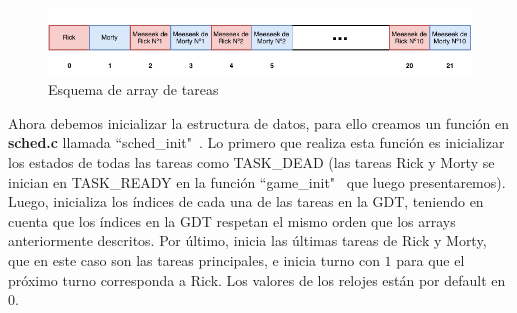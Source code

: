 \documentclass[a4paper]{article}
\begin{document}
\begin{figure}[h]
	\centering
	\includegraphics[scale=1.0]{img/ArrayRickyMortyIDX.pdf}
	\caption{Esquema de array de tareas}
	\label{fig:array_tarea}
\end{figure}

\justify


\justify
Ahora debemos inicializar la estructura de datos, para ello creamos un función en \textbf{sched.c} llamada ``sched_init"\ . Lo primero que realiza esta función es inicializar los estados de todas las tareas como TASK_DEAD (las tareas Rick y Morty se inician en TASK_READY en la función ``game_init" \ que luego presentaremos). Luego, inicializa los índices de cada una de las tareas en la GDT, teniendo en cuenta que los índices en la GDT respetan el mismo orden que los arrays anteriormente descritos. Por último, inicia las últimas tareas de Rick y Morty, que en este caso son las tareas principales, e inicia turno con $1$ para que el próximo turno corresponda a Rick. Los valores de los relojes están por default en 0.
\end{document}
